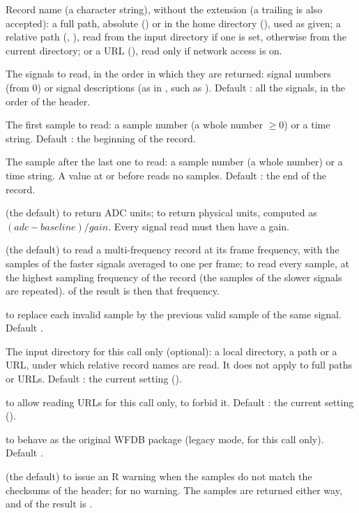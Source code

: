 \begin{params}
\item[record] Record name (a character string), without the  extension (a
  trailing  is also accepted): a full path, absolute
  () or in the home directory
  (), used as given; a relative path (,
  ), read from the input directory if one is set, otherwise from the
  current directory; or a URL (),
  read only if network access is on.
\item[channels] The signals to read, in the order in which they are returned: signal
  numbers (from 0) or signal descriptions (as in , such as ).
  Default : all the signals, in the order of the header.
\item[sampfrom] The first sample to read: a sample number (a whole number $\ge 0$) or a
  time string. Default : the beginning of the record.
\item[sampto] The sample after the last one to read: a sample number (a whole number) or
  a time string. A value at or before  reads no samples. Default
  : the end of the record.
\item[physical]  (the default) to return ADC units;  to return
  physical units, computed as $(\mathit{adc} - \mathit{baseline}) / \mathit{gain}$. Every
  signal read must then have a gain.
\item[highres]  (the default) to read a multi-frequency record at its frame
  frequency, with the samples of the faster signals averaged to one per frame;
   to read every sample, at the highest sampling frequency of the record (the
  samples of the slower signals are repeated).  of the result is then that
  frequency.
\item[pad]  to replace each invalid sample by the previous valid sample of the
  same signal. Default .
\item[input\_dir] The input directory for this call only (optional): a local directory, a
  \code{\textasciitilde} path or a URL, under which relative record names are read. It does not
  apply to full paths or URLs. Default : the current setting
  ().
\item[network]  to allow reading URLs for this call only,  to forbid
  it. Default : the current setting ().
\item[legacy]  to behave as the original WFDB package (legacy mode, for this
  call only). Default .
\item[checksum\_warning]  (the default) to issue an R warning when the samples
  do not match the checksums of the header;  for no warning. The samples are
  returned either way, and  of the result is .
\end{params}
